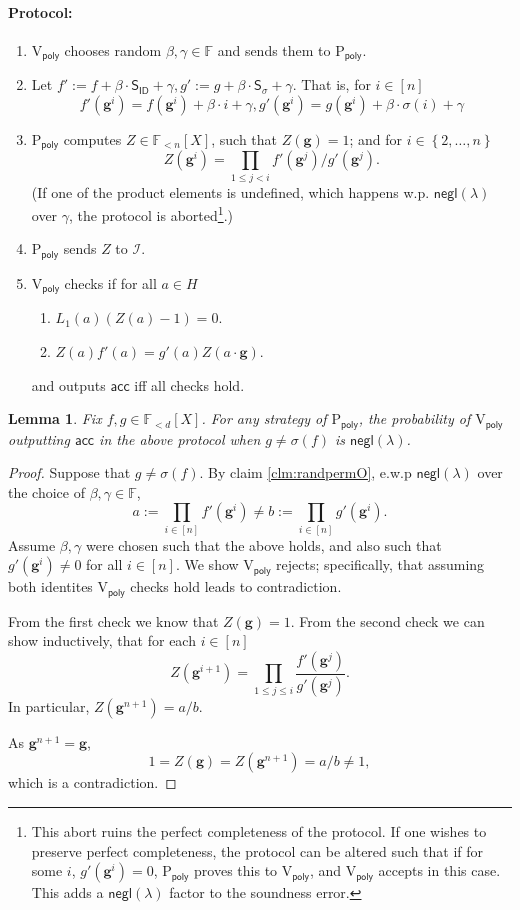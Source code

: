 \documentclass[11pt]{article} %
\newcommand{\F}{\ensuremath{\mathbb F}\xspace}
\newcommand{\sigof}[1]{\ensuremath{\sigma(#1)}\xspace}
\newcommand{\negl}{\ensuremath{\mathsf{negl}(\lambda)}\xspace}
\newcommand{\acc}{\ensuremath{\mathsf{acc}}\xspace}
\newcommand{\defeq}{:=}
\newcommand{\dom}{\ensuremath{H}\xspace}
\newcommand{\prvpoly}{\ensuremath{\mathrm{P_{\mathsf{poly}}}}\xspace}
\newcommand{\verpoly}{\ensuremath{\mathrm{V_{\mathsf{poly}}}}\xspace}
\newcommand{\ideal}{\ensuremath{\mathcal{I}}\xspace}
\newcommand{\set}[1]{\ensuremath{\left\{#1\right\}}\xspace}
\newcommand{\hgen}{\ensuremath{\mathbf{g}}\xspace}
\newcommand{\polysofdeg}[1]{\ensuremath{\F_{< #1}[X]}\xspace}
\newcommand{\sigpoly}{\ensuremath{\mathsf{S_{\sigma}}}\xspace}
\newcommand{\idpoly}{\ensuremath{\mathsf{S_{ID}}}\xspace}
\newtheorem{lemma}{Lemma}[section]
\begin{document}
\paragraph{Protocol:}
\begin{enumerate}
 \item\label{item:betgamma} \verpoly chooses random $\beta,\gamma \in\F$ and sends them to \prvpoly.
 \item Let $f'\defeq f+\beta\cdot  \idpoly +\gamma, g'\defeq g+\beta\cdot \sigpoly + \gamma$.
That is, for $i\in [n]$
 \[f'(\hgen^i) = f(\hgen^i) + \beta\cdot i + \gamma,
 g'(\hgen^i) = g(\hgen^i) + \beta\cdot \sigma(i) + \gamma\]
 \item \prvpoly computes $Z \in \polysofdeg{n}$, such that 
 $Z(\hgen) = 1$; and for $i\in \set{2,\ldots,n}$
 \[Z(\hgen^i)  = \prod_{1\leq j <i} f'(\hgen^j)/g'(\hgen^j).\]
 (If one of the product elements is undefined, which happens w.p. \negl over $\gamma$, the protocol is aborted\footnote{This abort ruins the perfect completeness of the protocol. If one wishes to preserve perfect completeness, the protocol can be altered such that if for some $i$, $g'(\hgen^i)=0$, \prvpoly proves this to \verpoly, and \verpoly accepts in this case. This adds a \negl factor to the soundness error.}.)
 \item \prvpoly sends $Z$ to \ideal.
 \item \verpoly checks if for all $a\in \dom$
 \begin{enumerate}
  \item $L_1(a) (Z(a)-1) = 0$.
  \item $Z(a)f'(a) = g'(a)Z(a\cdot \hgen)$.
 \end{enumerate}
and outputs \acc iff all checks hold.
\end{enumerate}


\begin{lemma}\label{lem:permprotocol}
Fix $f,g \in \polysofdeg{d}$.
For any strategy of \prvpoly, the probability of \verpoly outputting \acc in the above protocol when $g\neq \sigof{f}$ is \negl.
\end{lemma}
\begin{proof}
 Suppose that $g\neq \sigof{f}$. By claim \ref{clm:randpermO}, e.w.p \negl over the choice of $\beta,\gamma\in \F$, 
 \[a\defeq \prod_{i\in [n]}f'(\hgen^i)\neq b\defeq \prod_{i\in [n]} g'(\hgen^i).\]
 Assume $\beta,\gamma$ were chosen such that the above holds, and also such that $g'(\hgen^i)\neq 0$ for all $i\in [n]$. We show \verpoly rejects; specifically, that assuming both identites \verpoly checks hold leads to contradiction.
 
 From the first check we know that $Z(\hgen) = 1$.
From the second check we can show inductively, that for each $i\in [n]$
\[Z(\hgen^{i+1}) = \prod_{1\leq j \leq i} \frac{f'(\hgen^j)}{g'(\hgen^j)}.\]
In particular, $Z(\hgen^{n+1})=a/b$.

As $\hgen^{n+1}=\hgen$, 
\[1=Z(\hgen) = Z(\hgen^{n+1})= a/b \neq 1,\]
which is a contradiction.
\end{proof}
\end{document}
